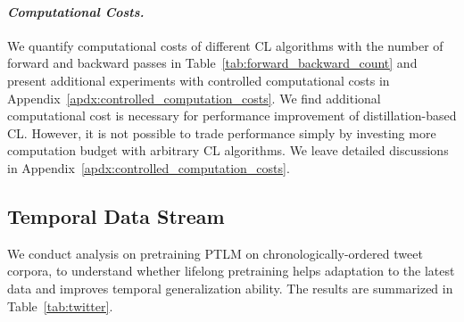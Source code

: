 \paragraph{\textit{Computational Costs.}} We quantify computational costs of different CL algorithms with the number of forward and backward passes in Table~\ref{tab:forward_backward_count} and present additional experiments with controlled computational costs in Appendix~\ref{apdx:controlled_computation_costs}. We find additional computational cost is necessary for performance improvement of distillation-based CL. However, it is not possible to trade performance simply by investing more computation budget with arbitrary CL algorithms. We leave detailed discussions in Appendix~\ref{apdx:controlled_computation_costs}.








\subsection{Temporal Data Stream}
\label{ssec:temporal_data_stream}

We conduct analysis on pretraining PTLM on chronologically-ordered tweet corpora, to understand whether lifelong pretraining helps adaptation to the latest data and improves temporal generalization ability. %
The results are summarized in Table~\ref{tab:twitter}.

